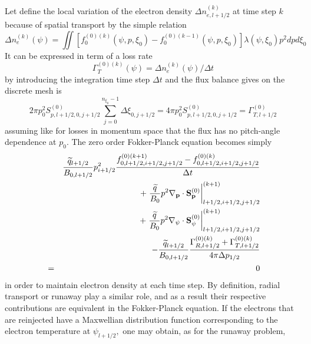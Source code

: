 Let define the local variation of the electron density $\Delta %
n_{e,l+1/2}^{\left( k\right) }$ at time step $k$ because of spatial
transport by the simple relation
\begin{equation}
\Delta n_{e}^{\left( k\right) }\left( \psi \right) =\iint \left[
f_{0}^{\left( 0\right) (k)}\left( \psi ,p,\xi _{0}\right) -f_{0}^{\left(
0\right) (k-1)}\left( \psi ,p,\xi _{0}\right) \right] \lambda \left( \psi
,\xi _{0}\right) p^{2}dpd\xi _{0}
\end{equation}
It can be expressed in term of a loss rate
\[
\Gamma _{T}^{\left( 0\right) (k)}\left( \psi \right) =\Delta n_{e}^{\left(
k\right) }\left( \psi \right) /\Delta t
\]
by introducing the integration time step $\Delta t$ and the flux balance
gives on the discrete mesh is
\begin{equation}
2\pi p_{0}^{2}S_{p,l+1/2,0,j+1/2}^{\left( 0\right) }\sum_{j=0}^{n_{\xi
_{0}}-1}\Delta \xi _{0,j+1/2}=4\pi p_{0}^{2}S_{p,l+1/2,0,j+1/2}^{\left(
0\right) }=\Gamma _{T,l+1/2}^{\left( 0\right) }
\end{equation}
assuming like for losses in momentum space that the flux has no pitch-angle
dependence at $p_{0}$. The zero order Fokker-Planck equation becomes simply
\begin{eqnarray}
&&\frac{\widetilde{q}_{l+1/2}}{B_{0,l+1/2}}p_{i+1/2}^{2}\frac{%
f_{0,l+1/2,i+1/2,j+1/2}^{\left( 0\right)
(k+1)}-f_{0,l+1/2,i+1/2,j+1/2}^{\left( 0\right) (k)}}{\Delta t}  \nonumber \\
&&+\left. \frac{\widetilde{q}}{B_{0}}p^{2}\nabla _{\mathbf{p}}\cdot \mathbf{S%
}_{\mathbf{p}}^{\left( 0\right) }\right| _{l+1/2,i+1/2,j+1/2}^{(k+1)}
\nonumber \\
&&+\left. \frac{\widetilde{q}}{B_{0}}p^{2}\nabla _{\psi }\cdot \mathbf{S}%
_{\psi }^{\left( 0\right) }\right| _{l+1/2,i+1/2,j+1/2}^{(k+1)}  \nonumber \\
&&-\frac{\widetilde{q}_{l+1/2}}{B_{0,l+1/2}}\frac{\Gamma _{R,l+1/2}^{\left(
0\right) (k)}+\Gamma _{T,l+1/2}^{\left( 0\right) (k)}}{4\pi \Delta p_{1/2}}
\nonumber \\
&=&0
\end{eqnarray}
in order to maintain electron density at each time step. By definition,
radial transport or runaway play a similar role, and as a result their
respective contributions are equivalent in the Fokker-Planck equation. If
the electrons that are reinjected have a Maxwellian distribution function
corresponding to the electron temperature at $\psi _{l+1/2},$ one may
obtain, as for the runaway problem,

